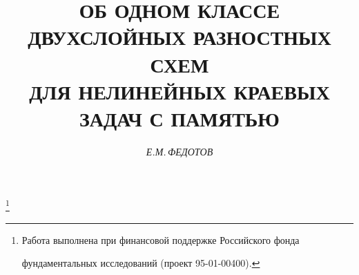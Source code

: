 






 




 


\newcommand{\A}{{\cal A}} 


























\renewcommand{\baselinestretch}{1.05}


 


\setcounter{page}{86} 








\author{\it Е.М.\,ФЕДОТОВ} 


\title{ОБ ОДНОМ КЛАССЕ ДВУХСЛОЙНЫХ РАЗНОСТНЫХ СХЕМ\\ 


ДЛЯ НЕЛИНЕЙНЫХ КРАЕВЫХ ЗАДАЧ С ПАМЯТЬЮ} 


 


\thanks{Работа выполнена при финансовой поддержке Российского фонда 


фундаментальных исследований (проект 95-01-00400).} 


\date{} 


